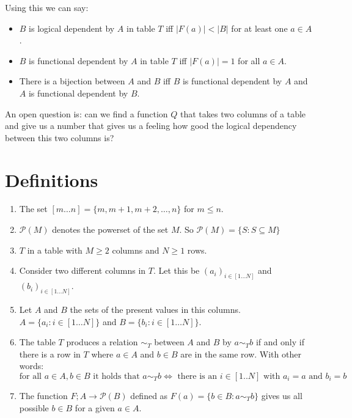 \documentclass[a4paper]{article}
\begin{document}
Using this we can say:
\begin{itemize}
\item $B$ is logical dependent by $A$ in table $T$ iff $|F(a)| < |B|$ for at least one $a \in A$.
\item $B$ is functional dependent by $A$ in table $T$ iff $|F(a)| = 1$ for all $a \in A$.
\item There is a bijection between $A$ and $B$ iff $B$ is functional dependent by $A$ and $A$ is functional dependent by $B$.
\end{itemize}

An open question is: can we find a function $Q$ that takes two columns of a table and give us a number that gives us a feeling how good the logical dependency between this two columns is?



\section{Definitions}

\begin{enumerate}
\item The set $[m \ldots n] = \{ m, m + 1, m + 2, \ldots, n \}$ for $m \leq n$.

\item $\mathcal{P}(M)$ denotes the powerset of the set $M$. So $\mathcal{P}(M) = \{ S : S \subseteq M \}$

\item $T$ in a table with $M \geq 2$ columns and $N \geq 1$ rows.

\item Consider two different columns in $T$.
      Let this be $(a_i)_{i \in [1 \ldots N]}$ and $(b_i)_{i \in [1 \ldots N]}$.

\item Let $A$ and $B$ the sets of the present values in this columns.
      \\ $A = \{ a_i : i \in [1 \ldots N] \}$ and $B = \{ b_i : i \in [1 \ldots N] \}$.

\item The table $T$ produces a relation $\sim_T$ between $A$ and $B$ by $a \sim_T b$ if and only if there is a row in $T$ where $a \in A$ and $b \in B$ are in the same row.
      With other words: 
      \[
          \mbox{for all } a \in A, b \in B \mbox{ it holds that }  a \sim_T b \Leftrightarrow \mbox{ there is an } i \in [1..N] \mbox{ with }a_i = a \mbox{ and } b_i = b
      \]

\item The function $F ; A \to \mathcal{P}(B)$ defined as $F(a) = \{ b \in B : a \sim_T b \}$ gives us all possible $b \in B$ for a given $a \in A$.

\end{enumerate}
\end{document}
